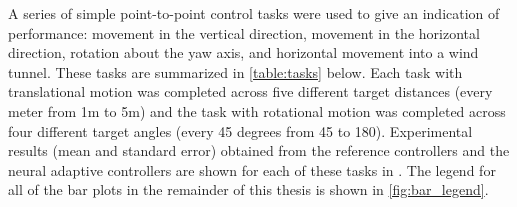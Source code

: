 \documentclass[letterpaper,12pt,titlepage,oneside,final]{book}
\begin{document}
A series of simple point-to-point control tasks were used to give an indication of performance:  movement in the vertical direction, movement in the horizontal direction, rotation about the yaw axis, and horizontal movement into a wind tunnel. %
These tasks are summarized in \autoref{table:tasks} below.
Each task with translational motion was completed across five different target distances (every meter from 1m to 5m) and the task with rotational motion was completed across four different target angles (every 45 degrees from 45{\degree} to 180{\degree}).
Experimental results (mean and standard error) obtained from the reference controllers and the neural adaptive controllers are shown for each of these tasks in .
The legend for all of the bar plots in the remainder of this thesis is shown in \autoref{fig:bar_legend}.
 

\end{document}
